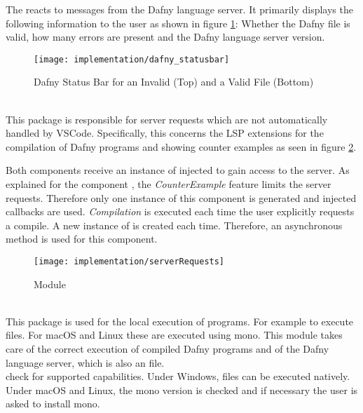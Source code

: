 The  reacts to messages from the Dafny language server.
It primarily displays the following information to the user as shown in figure \ref{fig:statusbar}:
Whether the Dafny file is valid, how many errors are present and the Dafny language server version.

\begin{figure}[H]
    \centering
    \texttt{[image: implementation/dafny\_statusbar]}
    \caption{Dafny Status Bar for an Invalid (Top) and a Valid File (Bottom)}
    \label{fig:statusbar}
\end{figure}

\textbf{}\\
This package is responsible for server requests which are not automatically handled by VSCode.
Specifically, this concerns the LSP extensions for the compilation of Dafny programs and showing counter examples
as seen in figure \ref{fig:serverRequests}.

Both components receive an instance of  injected to gain access to the server.
As explained for the component ,
the \textit{CounterExample} feature limits the server requests.
Therefore only one instance of this component is generated and injected callbacks are used.
\textit{Compilation} is executed each time the user explicitly requests a compile.
A new instance of  is created each time.
Therefore, an asynchronous method is used for this component.

\begin{figure}[H]
    \centering
    \texttt{[image: implementation/serverRequests]}
    \caption{Module }
    \label{fig:serverRequests}
\end{figure}

\textbf{}\\
This package is used for the local execution of programs.
For example to execute  files.
For macOS and Linux these are executed using mono. 
This module takes care of the correct execution of compiled Dafny programs
and of the Dafny language server, which is also an  file.\\

 check for supported capabilities.
Under Windows,  files can be executed natively.
Under macOS and Linux, the mono version is checked and if necessary the user is asked to install mono. \\

